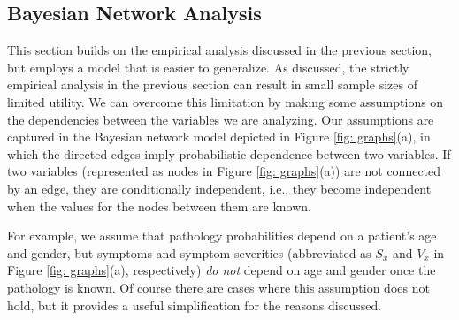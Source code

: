 \documentclass[11pt]{article}
\begin{document}
\subsection{Bayesian Network Analysis}

This section builds on the empirical analysis discussed in the previous section, but employs a model that is easier to generalize.  As discussed, the strictly empirical analysis in the previous section can result in small sample sizes of limited utility.  We can overcome this limitation by making some assumptions on the dependencies between the variables we are analyzing.  Our assumptions are captured in the Bayesian network \citep[pp. 360--383]{bishop2013pattern} model depicted in Figure \ref{fig: graphs}(a), in which the directed edges imply probabilistic dependence between two variables.  If two variables (represented as nodes in Figure \ref{fig: graphs}(a)) are not connected by an edge, they are conditionally independent, i.e., they become independent when the values for the nodes between them are known.  

For example, we assume that pathology probabilities depend on a patient's age and gender, but symptoms and symptom severities (abbreviated as $S_{x}$ and $V_{x}$ in Figure \ref{fig: graphs}(a), respectively) \emph{do not} depend on age and gender once the pathology is known.  Of course there are cases where this assumption does not hold, but it provides a useful simplification for the reasons discussed.
\end{document}
